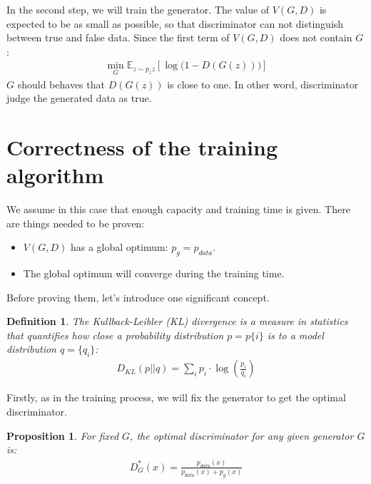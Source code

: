 \documentclass[10pt,twocolumn,letterpaper]{article}
\newtheorem{definition}{Definition}[section]
\newtheorem{proposition}{Proposition}[section]
\begin{document}
In the second step, we will train the generator. The value of $V(G, D)$ is expected to be as small as possible, so that discriminator can not distinguish between true and false data. Since the first term of $V(G, D)$ does not contain $G$: 
\begin{align*}
    \min\limits_G\mathbb{E}_{z \sim p_z{z}}[\log{\big(1 - D(G(z))\big)}]
\end{align*}
$G$ should behaves that $D(G(z))$ is close to one.  In other word, discriminator judge the generated data as true.

\section{Correctness of the training algorithm}
We assume in this case that enough capacity and training time is given. There are things needed to be proven:
\begin{itemize}
    \item $V(G, D)$ has a global optimum: $p_g = p_{data}$.
    \item The global optimum will converge during the training time.
\end{itemize}
Before proving them, let's introduce one significant concept.
\begin{definition}
The Kullback-Leibler (KL) divergence is a measure in statistics that quantifies how
close a probability distribution $p = p\{i\}$ is to a model distribution $q = \{q_i\}$:\cite{shlens2014notes}
\begin{align*}
    D_{KL}(p||q) = \sum_ip_i \cdot \log(\frac{p_i}{q_i}) 
\end{align*}
\end{definition}
Firstly, as in the training process, we will fix the generator to get the optimal discriminator.
\begin{proposition}
For fixed $G$, the optimal discriminator for any given generator $G$ is: \cite{goodfellow2014generative}
\begin{align*}
    D_G^*(x) = \frac{p_{data}(x)}{p_{data}(x) + p_g(x)}
\end{align*}
\end{proposition}
\end{document}
